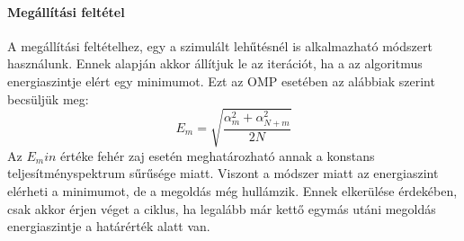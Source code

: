 \paragraph{Megállítási feltétel}
A megállítási feltételhez, egy a szimulált lehűtésnél is alkalmazható módszert használunk.
Ennek alapján akkor állítjuk le az iterációt, ha a az algoritmus energiaszintje elért egy minimumot. Ezt az OMP esetében az alábbiak szerint becsüljük meg:
\begin{equation}
    E_m = \sqrt{\frac{\alpha_m^2 + \alpha_{N + m}^2}{2N}}
\end{equation}
Az $E_min$ értéke fehér zaj esetén meghatározható annak a konstans teljesítményspektrum sűrűsége miatt.
Viszont a módszer miatt az energiaszint elérheti a minimumot, de a megoldás még hullámzik.
Ennek elkerülése érdekében, csak akkor érjen véget a ciklus, ha legalább már kettő egymás utáni megoldás energiaszintje a határérték alatt van.\cite{noise_reduction_omp}